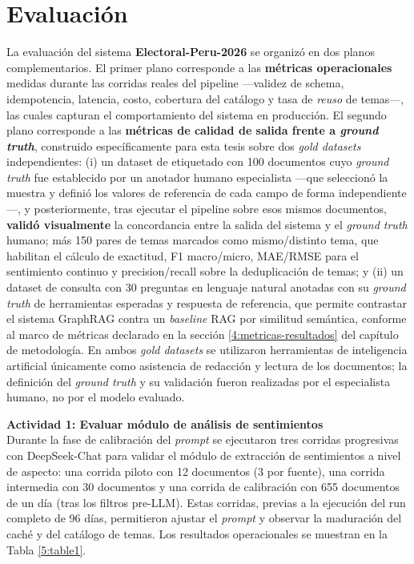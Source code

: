 \section{Evaluación}

La evaluación del sistema \textbf{Electoral-Peru-2026} se organizó en dos
planos complementarios. El primer plano corresponde a las \textbf{métricas
operacionales} medidas durante las corridas reales del pipeline —validez de
schema, idempotencia, latencia, costo, cobertura del catálogo y tasa de
\textit{reuso} de temas—, las cuales capturan el comportamiento del sistema
en producción. El segundo plano corresponde a las \textbf{métricas de
calidad de salida frente a \textit{ground truth}}, construido específicamente
para esta tesis sobre dos \textit{gold datasets} independientes: (i) un
dataset de etiquetado con 100 documentos cuyo \textit{ground truth} fue
establecido por un anotador humano especialista —que seleccionó la muestra y
definió los valores de referencia de cada campo de forma independiente—, y
posteriormente, tras ejecutar el pipeline sobre esos mismos documentos,
\textbf{validó visualmente} la concordancia entre la salida del sistema y el
\textit{ground truth} humano; más 150 pares de temas marcados como
mismo/distinto tema, que habilitan el cálculo de exactitud, F1 macro/micro,
MAE/RMSE para el sentimiento continuo y precision/recall sobre la
deduplicación de temas; y (ii) un dataset de consulta con 30 preguntas en
lenguaje natural anotadas con su \textit{ground truth} de herramientas
esperadas y respuesta de referencia, que permite contrastar el sistema
GraphRAG contra un \textit{baseline} RAG por similitud semántica, conforme al
marco de métricas declarado en la sección \ref{4:metricas-resultados} del
capítulo de metodología. En ambos \textit{gold datasets} se utilizaron
herramientas de inteligencia artificial únicamente como asistencia de
redacción y lectura de los documentos; la definición del \textit{ground
truth} y su validación fueron realizadas por el especialista humano, no por
el modelo evaluado.

\textbf{Actividad 1: Evaluar módulo de análisis de sentimientos}
\\
Durante la fase de calibración del \textit{prompt} se ejecutaron tres
corridas progresivas con DeepSeek-Chat para validar el módulo de extracción
de sentimientos a nivel de aspecto: una corrida piloto con 12 documentos
(3 por fuente), una corrida intermedia con 30 documentos y una corrida de
calibración con 655 documentos de un día (tras los filtros pre-LLM). Estas
corridas, previas a la ejecución del run completo de 96 días, permitieron
ajustar el \textit{prompt} y observar la maduración del caché y del catálogo
de temas. Los resultados operacionales se muestran en la Tabla
\ref{5:table1}.

